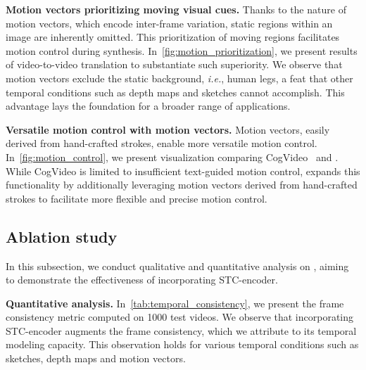 \textbf{Motion vectors prioritizing moving visual cues.}
Thanks to the nature of motion vectors, which encode inter-frame variation, static regions within an image are inherently omitted.
This prioritization of moving regions facilitates motion control during synthesis.
In~\cref{fig:motion_prioritization}, we present results of video-to-video translation to substantiate such superiority.
We observe that motion vectors exclude the static background, \textit{i.e.}, human legs, a feat that other temporal conditions such as depth maps and sketches cannot accomplish.
This advantage lays the foundation for a broader range of applications.

\textbf{Versatile motion control with motion vectors.}
Motion vectors, easily derived from hand-crafted strokes, enable more versatile motion control.
In~\cref{fig:motion_control}, we present visualization comparing CogVideo~\cite{hong2022cogvideo} and \method.
While CogVideo is limited to insufficient text-guided motion control, \method expands this functionality by additionally leveraging motion vectors derived from hand-crafted strokes to facilitate more flexible and precise motion control.

\subsection{Ablation study}
In this subsection, we conduct qualitative and quantitative analysis on \method, 
aiming to demonstrate the effectiveness of incorporating STC-encoder.

\textbf{Quantitative analysis.}
In~\cref{tab:temporal_consistency}, we present the frame consistency metric computed on 1000 test videos. %
We observe that incorporating STC-encoder augments the frame consistency, which we attribute to its temporal modeling capacity.
This observation holds for various temporal conditions such as sketches, depth maps and motion vectors.

